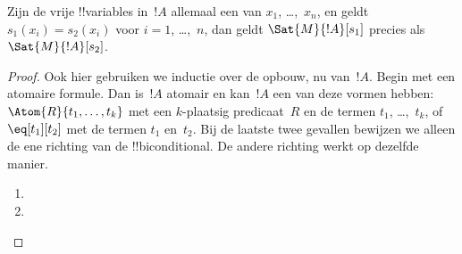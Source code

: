\documentclass[openany]{memoir}
\begin{document}
\begin{prop}
Zijn de vrije !!{variable}s in~$!A$ allemaal een van
$x_1$, \dots,~$x_n$, en geldt $s_1(x_i) = s_2(x_i)$ voor
$i = 1$, \dots,~$n$, dan geldt $\Sat{M}{!A}[s_1]$ precies als
$\Sat{M}{!A}[s_2]$.
\end{prop}

\begin{proof}
Ook hier gebruiken we inductie over de opbouw, nu van~$!A$. Begin met
een atomaire formule. Dan is~$!A$ atomair en kan~$!A$ een van deze
vormen hebben:
$\Atom{R}{t_1, \dots, t_k}$ met een $k$-plaatsig predicaat~$R$ en de
termen $t_1$, \dots,~$t_k$, of $\eq[t_1][t_2]$ met de termen $t_1$
en~$t_2$. Bij de laatste twee gevallen bewijzen we alleen de ene
richting van de !!{biconditional}. De andere richting werkt op
dezelfde manier.

\begin{enumerate}


\item
\item
\end{enumerate}


\end{proof}
\end{document}

